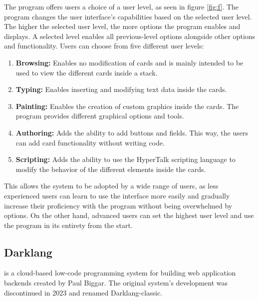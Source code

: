 The program offers users a choice of a user level, as seen in figure \ref{fig:f}. The program changes the user interface's capabilities based on the selected user level.
The higher the selected user level, the more options the program enables and displays. A selected level enables all previous-level options alongside other options and functionality.
Users can choose from five different user levels:
\begin{enumerate}
	\item \textbf{Browsing:} Enables no modification of cards and is mainly intended to be used to view the different cards inside a stack.
	\item \textbf{Typing:} Enables inserting and modifying text data inside the cards.
	\item \textbf{Painting:} Enables the creation of custom graphics inside the cards. The program provides different graphical options and tools.
	\item \textbf{Authoring:} Adds the ability to add buttons and fields. This way, the users can add card functionality without writing code.
	\item \textbf{Scripting:} Adds the ability to use the HyperTalk scripting language to modify the behavior of the different elements inside the cards.
\end{enumerate}
This allows the system to be adopted by a wide range of users, as less experienced users can learn to use the interface more easily and gradually increase their proficiency with the program without being overwhelmed by options.
On the other hand, advanced users can set the highest user level and use the program in its entirety from the start.

\subsection{Darklang}
\label{sec:darklang}
\citet{darklang} is a cloud-based low-code programming system for building web application backends created by Paul Biggar.
The original system's development was discontinued in 2023 and renamed Darklang-classic.

